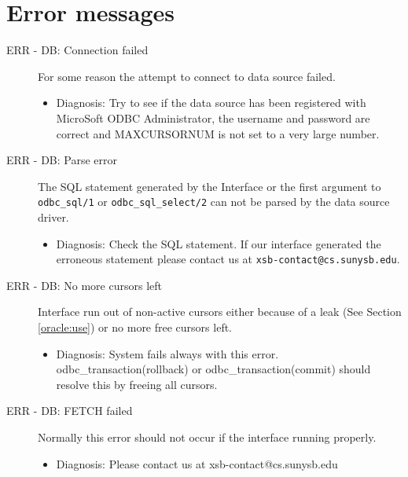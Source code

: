 \section{Error messages}
\begin{description}
\item[ERR - DB: Connection failed] For some reason the attempt to connect
	to data source failed.
	\begin{itemize}
	\item	Diagnosis: Try to see if the data source has been registered 
                                  with MicroSoft ODBC Administrator, the username and 
                                  password are correct and MAXCURSORNUM is not set 
                                  to a very large number.
	\end{itemize}

\item[ERR - DB: Parse error] The SQL statement generated by the
	                  Interface or the first argument to {\tt odbc\_sql/1} or 
	               {\tt odbc\_sql\_select/2} can not be parsed by the data 
                              source driver.
	\begin{itemize}
	\item	Diagnosis: Check the SQL statement.  If our interface
		generated the erroneous statement please contact us at
		{\tt xsb-contact@cs.sunysb.edu}.
	\end{itemize}

\item[ERR - DB: No more cursors left] Interface run out of non-active
cursors either because of a leak (See Section \ref{oracle:use}) or no
more free cursors left. 
\begin{itemize}

\item Diagnosis: System fails always with this error.  odbc\_transaction(rollback) or
	   odbc\_transaction(commit) should resolve this by freeing all cursors.
\end{itemize}

\item[ERR - DB: FETCH failed] Normally this error should not occur if the 
interface running properly.
\begin{itemize}

\item Diagnosis: Please contact us at xsb-contact@cs.sunysb.edu
\end{itemize}

\end{description}

